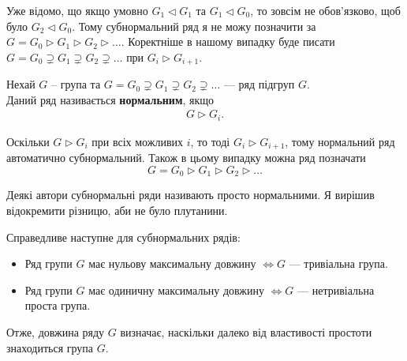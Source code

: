 \documentclass{math_library}
\begin{document}
\begin{remark}
Уже відомо, що якщо умовно $G_1 \triangleleft G_1$ та $G_1 \triangleleft G_0$, то зовсім не обов'язково, щоб було $G_2 \triangleleft G_0$. Тому субнормальний ряд я не можу позначити за $G = G_0 \triangleright G_1 \triangleright G_2 \triangleright \dots$. Коректніше в нашому випадку буде писати $G = G_0 \supsetneq G_1 \supsetneq G_2 \supsetneq \dots$ при $G_i \triangleright G_{i+1}$.
\end{remark}

\begin{definition}
Нехай $G$ -- група та $G = G_0 \supsetneq G_1 \supsetneq G_2 \supsetneq \dots$ --- ряд підгруп $G$.\\
Даний ряд називається \textbf{нормальним}, якщо
\begin{align*}
G \triangleright G_{i}.
\end{align*}
\end{definition}

\begin{remark}
Оскільки $G \triangleright G_i$ при всіх можливих $i$, то тоді $G_i \triangleright G_{i+1}$, тому нормальний ряд автоматично субнормальний. Також в цьому випадку можна ряд позначати 
\[
G = G_0 \triangleright G_1 \triangleright G_2 \triangleright \dots
\]
\end{remark}

\begin{remark}
Деякі автори субнормальні ряди називають просто нормальними. Я вирішив відокремити різницю, аби не було плутанини.
\end{remark}

\begin{remark}
Справедливе наступне для субнормальних рядів:
\begin{itemize}[nosep,wide=0pt]
\item Ряд групи $G$ має нульову максимальну довжину $\iff G$ --- тривіальна група.

\item Ряд групи $G$ має одиничну максимальну довжину $\iff G$ --- нетривіальна проста група.
\end{itemize}
Отже, довжина ряду $G$ визначає, наскільки далеко від властивості простоти знаходиться група $G$.
\end{remark}
\end{document}
